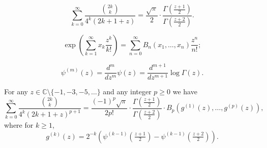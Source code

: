 \documentclass[10pt,a4paper]{amsart}
\begin{document}
\begin{equation}\label{2.2}
\sum_{k=0}^\infty\frac{\binom{2k}{k}}{4^k(2k+1+z)}
=\frac{\sqrt{\pi}}{2}\cdot\frac{\Gamma(\frac{z+1}{2})}{\Gamma(\frac{z+2}{2})}.
\end{equation}

\begin{equation}\label{5.1}
\exp\left(\sum_{k=1}^\infty x_k\frac{z^k}{k!}\right)
=\sum_{n=0}^\infty B_n(x_1,\ldots,x_n)\frac{z^n}{n!};
\end{equation}

\begin{equation}\label{5.4}
\psi^{(m)}(z) = \frac{d^m}{dz^m}\psi(z)=\frac{d^{m+1}}{dz^{m+1}}\log{\Gamma(z)}.
\end{equation}

\begin{theorem}\label{thm:5.1}
For any $z\in{\mathbb C}\setminus\{-1,-3,-5,\ldots\}$ and any integer 
$p\geq 0$ we have
\begin{equation}\label{5.5}
\sum_{k=0}^\infty\frac{\binom{2k}{k}}{4^k(2k+1+z)^{p+1}}
=\frac{(-1)^p\sqrt{\pi}}{2p!}
\cdot\frac{\Gamma(\frac{z+1}{2})}{\Gamma(\frac{z+2}{2})}
\cdot B_{p}(g^{(1)}(z),\ldots,g^{(p)}(z)),
\end{equation}
where for $k\geq 1$,
\begin{equation}\label{5.6}
g^{(k)}(z)
= 2^{-k}\left(\psi^{(k-1)}(\tfrac{z+1}{2})-\psi^{(k-1)}(\tfrac{z+2}{2})\right).
\end{equation}
\end{theorem}
\end{document}
